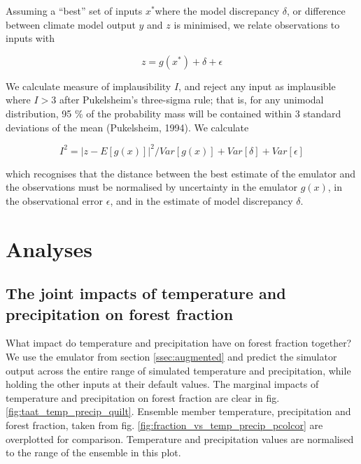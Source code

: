 \documentclass[gmd, manuscript]{copernicus}
\begin{document}
Assuming a ``best'' set of inputs $x^*$where the model discrepancy $\delta$, or difference between climate model output $y$ and $z$ is minimised, we relate observations to inputs with 

\begin{equation}
z = g(x^*) + \delta + \epsilon 
\end{equation}

We calculate measure of implausibility $I$, and reject any input as implausible where $I >3$ after Pukelsheim's three-sigma rule; that is, for any unimodal distribution, 95 \% of the probability mass will be contained within 3 standard deviations of the mean (Pukelsheim, 1994). We calculate

\begin{equation}
I^{2} = {\lvert  z - E[g(x)]\rvert}^{2} /  Var[g(x)] + Var[\delta] +  Var[\epsilon]
\end{equation}

which recognises that the distance between the best estimate of the emulator and the observations must be normalised by uncertainty in the emulator $g(x)$, in the observational error $\epsilon$, and in the estimate of model discrepancy $\delta$. 


\section{Analyses}\label{sec:analyses}

\subsection{The joint impacts of temperature and precipitation on forest fraction}\label{ssec:joint}
What impact do temperature and precipitation have on forest fraction together? We use the emulator from section \ref{ssec:augmented} and predict the simulator output across the entire range of simulated temperature and precipitation, while holding the other inputs at their default values. The marginal impacts of temperature and precipitation on forest fraction are clear in fig. \ref{fig:taat_temp_precip_quilt}. Ensemble member temperature, precipitation and forest fraction, taken from fig. \ref{fig:fraction_vs_temp_precip_pcolcor} are overplotted for comparison. Temperature and precipitation values are normalised to the range of the ensemble in this plot.
\end{document}
